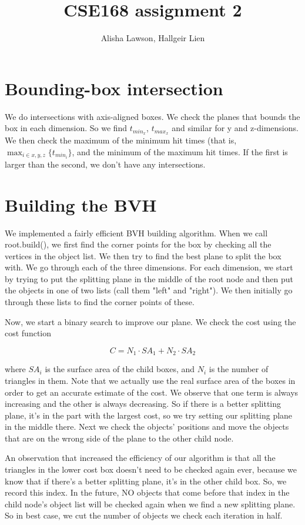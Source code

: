 \documentclass{article} %
\title{CSE168 assignment 2}
\author{Alisha Lawson, Hallgeir Lien}
\date{} %
\begin{document}
\maketitle

\section{Bounding-box intersection}
We do intersections with axis-aligned boxes. We check the planes that bounds the box in each dimension. So we find $t_{min_x}$, $t_{max_x}$ and similar for y and z-dimensions. We then check the maximum of the minimum hit times (that is, $\max_{i\in x,y,z}\{t_{min_i}\}$, and the minimum of the maximum hit times. If the first is larger than the second, we don't have any intersections.

\section{Building the BVH}
We implemented a fairly efficient BVH building algorithm. When we call root.build(), we first find the corner points for the box by checking all the vertices in the object list. We then try to find the best plane to split the box with. We go through each of the three dimensions. For each dimension, we start by trying to put the splitting plane in the middle of the root node and then put the objects in one of two lists (call them "left" and "right"). We then initially go through these lists to find the corner points of these. 

Now, we start a binary search to improve our plane. We check the cost using the cost function

$$
C=N_1\cdot SA_1+N_2\cdot SA_2
$$

where $SA_i$ is the surface area of the child boxes, and $N_i$ is the number of triangles in them. Note that we actually use the real surface area of the boxes in order to get an accurate estimate of the cost. We observe that one term is always increasing and the other is always decreasing. So if there is a better splitting plane, it's in the part with the largest cost, so we try setting our splitting plane in the middle there. Next we check the objects' positions and move the objects that are on the wrong side of the plane to the other child node.

An observation that increased the efficiency of our algorithm is that all the triangles in the lower cost box doesn't need to be checked again ever, because we know that if there's a better splitting plane, it's in the other child box. So, we record this index. In the future, NO objects that come before that index in the child node's object list will be checked again when we find a new splitting plane. So in best case, we cut the number of objects we check each iteration in half. 
\end{document}

